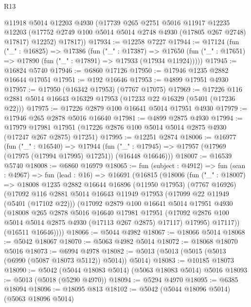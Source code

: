 \begin{lexlean}{R13}
\begin{coremodule}
        @11918
        @5014
        @12203
        @4930
        (@17739
          @265
          @2751
          @5016
          @11917
          @12235
          @12203
          (@17752 @2749 @100 @5014 @5014 @2748 @4930 (@17805 @267 @2748) @17817)
          @12252)
        @17817))
@17934 := @12258 @7227
@17944 := @17124
    (fun ("_" : @16825) =>
    @17386
      (fun ("_" : @17387) =>
      @17650 (fun ("_" : @17651) => @17890 (fun ("_" : @17891) => @17933 (@17934 @11924)))))
@17945 := @16824 @5740
@17946 := @6860 @17126
@17950 := @17946 @1235 @2882 @16644 @17051
@17951 := @192 @16646
@17953 := @4899 @17951 @4930
@17957 := @17950 (@16342 @17953) (@7767 @17075)
@17969 := @17226 @116 @2881 @5014 @16643 @16329 @17953 (@17233 @22 @16329 (@5401 (@17236 @22)))
@17975 := @17226 @2879 @100 @16641 @5014 @17951 @4930
@17979 := @17946 @265 @2878 @5016 @16640
@17981 := @4899 @2875 @4930
@17994 := @17979
    @17981
    @17951
    (@17226 @2876 @100 @5014 @5014 @2875 @4930 (@17247 @267 @2875) @17251)
@17995 := @12251 @2874
@18006 := @16977
    (fun ("_" : @16540) =>
    @17944 (fun ("_" : @17945) => @17957 (@17969 (@17975 (@17994 @17995) @17251)) (@16448 @16646)))
@18007 := @16539 @5740
@18008 := @6860 @16979
@18065 := fun (subject : @4912) =>
  fun (scan : @4967) =>
  fun (lead : @16) =>
  @16691
    (@16815
      (@18006
        (fun ("_" : @18007) =>
        @18008
          @1235
          @2882
          @16644
          @16896
          (@11950 @17953)
          (@7767 @16926)
          (@17092
            @116
            @2881
            @5014
            @16643
            @11949
            @17953
            (@17099 @22 @11949 (@5401 (@17102 @22)))
            (@17092
              @2879
              @100
              @16641
              @5014
              @17951
              @4930
              (@18008
                @265
                @2878
                @5016
                @16640
                @17981
                @17951
                (@17092 @2876 @100 @5014 @5014 @2875 @4930 (@17113 @267 @2875) @17117)
                @17995)
              @17117))
          (@16511 @16646))))
@18066 := @5044 @4982
@18067 := @18066 @5014
@18068 := @5042 @18067
@18070 := @5063 @4982 @5014
@18072 := @18068 @18070 @5016
@18073 := @6994 @4978
@18082 := @5013 (@5013 (@5015 (@5013 (@6990 (@5087 @18073 @5112)) @5014)) @5014)
@18083 := @10185 @18073
@18090 := @5042 (@5044 @18083 @5014) (@5063 @18083 @5014) @5016
@18093 := @5013 (@5018 (@5290 @4970))
@18094 := @5294 @4970
@18095 := @6385 @18094
@18096 := @18095 @813
@18102 := @5042 (@5044 @18096 @5014) (@5063 @18096 @5014)

\end{coremodule}
\end{lexlean}
